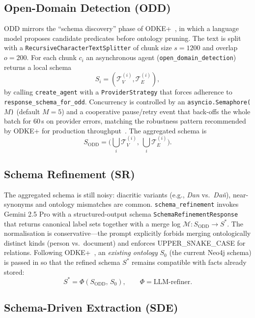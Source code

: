 \documentclass[11pt,a4paper]{article}
\begin{document}
\subsection{Open-Domain Detection (ODD)}

ODD mirrors the ``schema discovery'' phase of ODKE+~\cite{odkeplus2025}, in
which a language model proposes candidate predicates before ontology pruning.
The text is split with a \texttt{RecursiveCharacterTextSplitter} of chunk size
$s=1200$ and overlap $o=200$. For each chunk $c_i$ an asynchronous agent
(\texttt{open\_domain\_detection}) returns a local schema
\[
S_i=(\mathcal{T}^{(i)}_V,\mathcal{T}^{(i)}_E),
\]
by calling \texttt{create\_agent} with a \texttt{ProviderStrategy} that forces
adherence to \texttt{response\_schema\_for\_odd}. Concurrency is controlled by
an \texttt{asyncio.Semaphore($M$)} (default $M=5$) and a cooperative
pause/retry event that back-offs the whole batch for 60\,s on provider errors,
matching the robustness pattern recommended by ODKE+ for production
throughput~\cite{odkeplus2025}. The aggregated schema is
\[
S_{\text{ODD}}=\Big(\bigcup_i \mathcal{T}^{(i)}_V,\ \bigcup_i \mathcal{T}^{(i)}_E\Big).
\]

\subsection{Schema Refinement (SR)}

The aggregated schema is still noisy: diacritic variants (e.g., \emph{Dan}
vs.\ \emph{Daň}), near-synonyms and ontology mismatches are common.
\texttt{schema\_refinement} invokes Gemini 2.5 Pro with a structured-output
schema \texttt{SchemaRefinementResponse} that returns canonical label sets
together with a merge log $\mathcal{M}:S_{\text{ODD}}\to S^{\ast}$. The
normalisation is conservative---the prompt explicitly forbids merging
ontologically distinct kinds (person vs.\ document) and enforces
\textsc{UPPER\_SNAKE\_CASE} for relations. Following
ODKE+~\cite{odkeplus2025}, an \emph{existing ontology} $S_0$ (the current
Neo4j schema) is passed in so that the refined schema $S^\ast$ remains
compatible with facts already stored:
\[
S^{\ast}=\Phi(S_{\text{ODD}},\,S_0),\qquad
\Phi=\text{LLM-refiner}.
\]

\subsection{Schema-Driven Extraction (SDE)}
\end{document}
